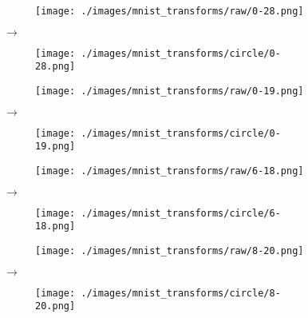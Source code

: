 \begin{figure}[H]
    \centering

    \begin{subfigure}{.15\columnwidth}
        \centering
        \texttt{[image: ./images/mnist\_transforms/raw/0-28.png]}
        \caption{}
        \label{fig:circle_orig1}
    \end{subfigure}%
    $\rightarrow$
    \begin{subfigure}{.15\columnwidth}
        \centering
        \texttt{[image: ./images/mnist\_transforms/circle/0-28.png]}
        \caption{}
        \label{fig:circle_transform1}
    \end{subfigure}

    \par\medskip

    \begin{subfigure}{.15\columnwidth}
        \centering
        \texttt{[image: ./images/mnist\_transforms/raw/0-19.png]}
        \caption{}
        \label{fig:circle_orig2}
    \end{subfigure}%
    $\rightarrow$
    \begin{subfigure}{.15\columnwidth}
        \centering
        \texttt{[image: ./images/mnist\_transforms/circle/0-19.png]}
        \caption{}
        \label{fig:circle_transform2}
    \end{subfigure}%

    \par\medskip

    \begin{subfigure}{.15\columnwidth}
        \centering
        \texttt{[image: ./images/mnist\_transforms/raw/6-18.png]}
        \caption{}
        \label{fig:circle_orig3}
    \end{subfigure}%
    $\rightarrow$
    \begin{subfigure}{.15\columnwidth}
        \centering
        \texttt{[image: ./images/mnist\_transforms/circle/6-18.png]}
        \caption{}
        \label{fig:circle_transform3}
    \end{subfigure}%

    \par\medskip

    \begin{subfigure}{.15\columnwidth}
        \centering
        \texttt{[image: ./images/mnist\_transforms/raw/8-20.png]}
        \caption{}
        \label{fig:circle_orig4}
    \end{subfigure}%
    $\rightarrow$
    \begin{subfigure}{.15\columnwidth}
        \centering
        \texttt{[image: ./images/mnist\_transforms/circle/8-20.png]}
        \caption{}
        \label{fig:circle_transform4}
    \end{subfigure}%


\end{figure}
